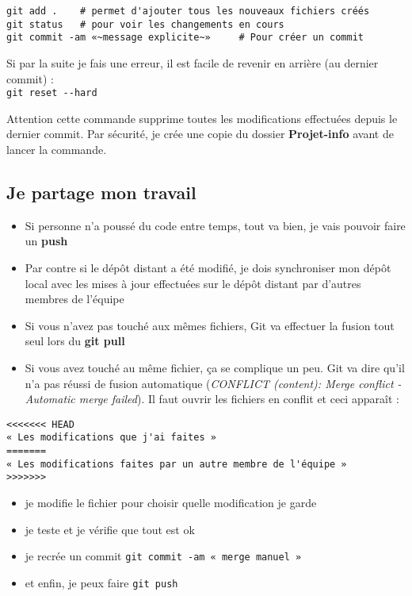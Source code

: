 \documentclass[11pt]{article}
\begin{document}
\noindent
\verb"git add .    # permet d'ajouter tous les nouveaux fichiers créés" \\
\verb"git status   # pour voir les changements en cours" \\
\verb"git commit -am «~message explicite~»     # Pour créer un commit" \\

\bigbreak

Si par la suite je fais une erreur, il est facile de revenir en arrière (au dernier commit) :\\
\verb"git reset --hard" 

\bigbreak

Attention cette commande supprime toutes les modifications effectuées depuis le dernier commit. Par sécurité, je crée une copie du dossier \textbf{Projet-info} avant de lancer la commande.



\subsection*{Je partage mon travail}

\begin{itemize}
    \item Si personne n'a poussé du code entre temps, tout va bien, je vais pouvoir faire un \textbf{push}
    \item Par contre si le dépôt distant a été modifié, je dois synchroniser mon dépôt local avec les mises à jour effectuées sur le dépôt distant par d'autres membres de l'équipe
    \item Si vous n'avez pas touché aux mêmes fichiers, Git va effectuer la fusion tout seul lors du \textbf{git pull}
    \item Si vous avez touché au même fichier, ça se complique un peu. Git va dire qu'il n'a pas réussi de fusion automatique (\textit{CONFLICT (content): Merge conflict - Automatic merge failed}). Il faut ouvrir les fichiers en conflit et ceci apparaît : 
\end{itemize}


\noindent
\verb"<<<<<<< HEAD" \\
\verb"« Les modifications que j'ai faites »" \\
\verb"=======" \\
\verb"« Les modifications faites par un autre membre de l'équipe »" \\
\verb">>>>>>>" \\

\begin{itemize}
    \item je modifie le fichier pour choisir quelle modification je garde
    \item je teste et je vérifie que tout est ok
    \item je recrée un commit \verb"git commit -am « merge manuel »"
    \item et enfin, je peux faire \verb"git push"
\end{itemize}
\end{document}
